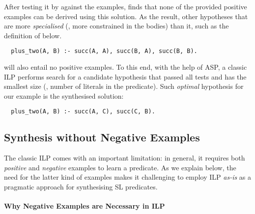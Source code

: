 %
%
After testing it by \prolog against the examples, \popper finds that
none of the provided positive examples can be derived using this
solution.
%
As the result, other hypotheses that are more \emph{specialised} (\ie,
more constrained in the bodies) than it, such as the definition of
 below.
%
\begin{verbatim}
  plus_two(A, B) :- succ(A, A), succ(B, A), succ(B, B).
\end{verbatim}
%
will also entail no positive examples.
%
To this end, with the help of ASP, a classic ILP performs search for
a candidate hypothesis that passed all tests and has the smallest size
(\ie, number of literals in the predicate). Such \emph{optimal}
hypothesis for our example is the synthesised solution:
%
\begin{verbatim}
  plus_two(A, B) :- succ(A, C), succ(C, B).
\end{verbatim}


\subsection{Synthesis without Negative Examples}
\label{sec:approach}

The classic ILP comes with an important limitation: in general, it
requires both \emph{positive} and \emph{negative} examples to learn a
predicate. As we explain below, the need for the latter kind of
examples makes it challenging to employ ILP \emph{as-is} as a
pragmatic approach for synthesising SL predicates.


\paragraph{Why Negative Examples are Necessary in ILP}


